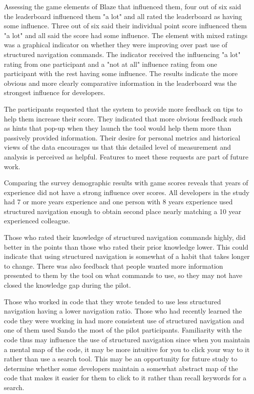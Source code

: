 \documentclass{sig-alternate}
\begin{document}
Assessing the game elements of Blaze that influenced them, four out of six said the leaderboard influenced them "a lot" and all rated the leaderboard as having some influence.  Three out of six  said their individual point score influenced them "a lot" and all said the score had some influence.  The element with mixed ratings was a graphical indicator on whether they were improving over past use of structured navigation commands.  The indicator received the influencing "a lot" rating from one participant and a "not at all" influence rating from one participant with the rest having some influence.  The results indicate the more obvious and more clearly comparative information in the leaderboard was the strongest influence for developers.

The participants requested that the system to provide more feedback on tips to help them increase their score. They indicated that more obvious feedback such as hints that pop-up when they launch the tool would help them more than passively provided information.  Their desire for personal metrics and historical views of the data encourages us that this detailed level of measurement and analysis is perceived as helpful.  Features to meet these requests are part of future work.    

Comparing the survey demographic results with game scores reveals that years of experience did not have a strong influence over scores.  All developers in the study had 7 or more years experience and one person with 8 years experience used structured navigation enough to obtain second place nearly matching a 10 year experienced colleague.    

Those who rated their knowledge of structured navigation commands highly, did better in the points than those who rated their prior knowledge lower.  This could indicate that using structured navigation is somewhat of a habit that takes longer to change.  There was also feedback that people wanted more information presented to them by the tool on what commands to use, so they may not have closed the knowledge gap during the pilot.  

Those who worked in code that they wrote tended to use less structured navigation having a lower navigation ratio.  Those who had recently learned the code they were working in had more consistent use of structured navigation and one of them used Sando the most of the pilot participants.  Familiarity with the code thus may influence the use of structured navigation since when you maintain a mental map of the code, it may be more intuitive for you to click your way to it rather than use a search tool.  This may be an opportunity for future study to determine whether some developers maintain a somewhat abstract map of the code that makes it easier for them to click to it rather than recall keywords for a search.  %
\end{document}
